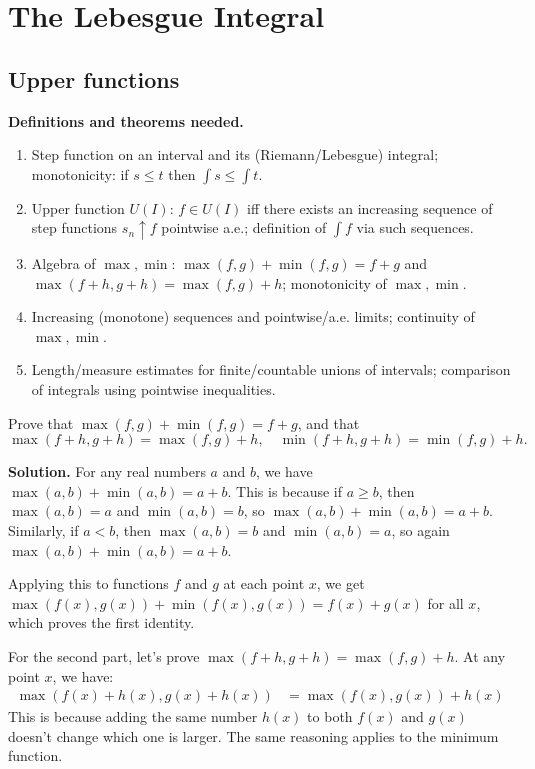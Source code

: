 \chapter{The Lebesgue Integral}

\section{Upper functions}

\noindent\textbf{Definitions and theorems needed.}
\begin{enumerate}[label=(\alph*)]
    \item Step function on an interval and its (Riemann/Lebesgue) integral; monotonicity: if $s\le t$ then $\int s\le\int t$.
    \item Upper function $U(I)$: $f\in U(I)$ iff there exists an increasing sequence of step functions $s_n\uparrow f$ pointwise a.e.; definition of $\int f$ via such sequences.
    \item Algebra of $\max,\min$: $\max(f,g)+\min(f,g)=f+g$ and $\max(f+h,g+h)=\max(f,g)+h$; monotonicity of $\max,\min$.
    \item Increasing (monotone) sequences and pointwise/a.e. limits; continuity of $\max,\min$.
    \item Length/measure estimates for finite/countable unions of intervals; comparison of integrals using pointwise inequalities.
\end{enumerate}

\begin{problembox}
Prove that $\max(f, g) + \min(f, g) = f + g$, and that 
\[ \max(f + h, g + h) = \max(f, g) + h, \quad \min(f + h, g + h) = \min(f, g) + h. \]
\end{problembox}

\noindent\textbf{Solution.}
For any real numbers $a$ and $b$, we have $\max(a, b) + \min(a, b) = a + b$. This is because if $a \geq b$, then $\max(a, b) = a$ and $\min(a, b) = b$, so $\max(a, b) + \min(a, b) = a + b$. Similarly, if $a < b$, then $\max(a, b) = b$ and $\min(a, b) = a$, so again $\max(a, b) + \min(a, b) = a + b$.

Applying this to functions $f$ and $g$ at each point $x$, we get $\max(f(x), g(x)) + \min(f(x), g(x)) = f(x) + g(x)$ for all $x$, which proves the first identity.

For the second part, let's prove $\max(f + h, g + h) = \max(f, g) + h$. At any point $x$, we have:
\begin{align*}
\max(f(x) + h(x), g(x) + h(x)) &= \max(f(x), g(x)) + h(x)
\end{align*}
This is because adding the same number $h(x)$ to both $f(x)$ and $g(x)$ doesn't change which one is larger. The same reasoning applies to the minimum function.

